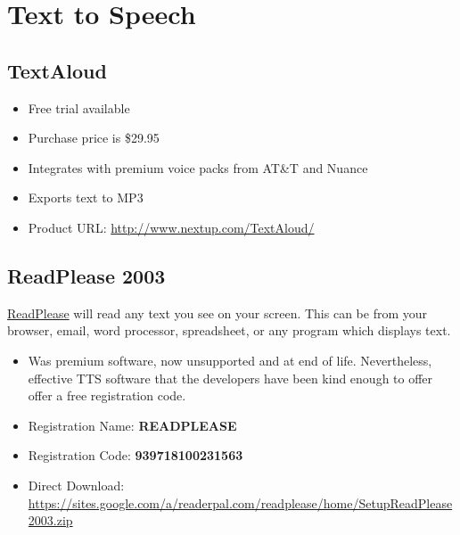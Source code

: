 \documentclass[letterpaper,10pt,english]{sphinxmanual}
\begin{document}
\section{Text to Speech}
\label{resources:text-to-speech}

\subsection{TextAloud}
\label{resources:textaloud}\begin{itemize}
\item {} 
Free trial available

\item {} 
Purchase price is \$29.95

\item {} 
Integrates with premium voice packs from AT\&T and Nuance

\item {} 
Exports text to MP3

\item {} 
Product URL: \href{http://www.nextup.com/TextAloud/}{http://www.nextup.com/TextAloud/}

\end{itemize}


\subsection{ReadPlease 2003}
\label{resources:readplease-2003}
\href{https://sites.google.com/a/readerpal.com/readplease/}{ReadPlease} will read any text you see on your screen. This can be from your browser, email, word processor, spreadsheet, or any program which displays text.
\begin{itemize}
\item {} 
Was premium software, now unsupported and at end of life. Nevertheless, effective TTS software that the developers have been kind enough to offer offer a free registration code.

\item {} 
Registration Name: \textbf{READPLEASE}

\item {} 
Registration Code: \textbf{939718100231563}

\item {} 
Direct Download:  \href{https://sites.google.com/a/readerpal.com/readplease/home/SetupReadPlease2003.zip}{https://sites.google.com/a/readerpal.com/readplease/home/SetupReadPlease2003.zip}

\end{itemize}
\end{document}
